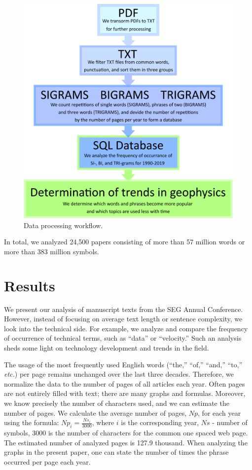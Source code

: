 \documentclass[geosciences,article,submit,moreauthors,pdftex]{Definitions/mdpi}
\begin{document}
\begin{figure}[ht!]
\centering
\includegraphics[scale=1]{scheme.png}
\caption{Data processing workflow.}
\label{scheme_workflow}
\end{figure}


In total, we analyzed 24,500 papers consisting of more than 57 million words or more than 383 million symbols.

 
\section{Results}

We present our analysis of manuscript texts from the SEG Annual Conference. However, instead of focusing on average text length or sentence complexity, we look into the technical side. For example, we analyze and compare the frequency of occurrence of technical terms, such as ``data'' or ``velocity.'' Such an analysis sheds some light on technology development and trends in the field.

The usage of the most frequently used English words (``the,'' ``of,'' ``and,'' ``to,'' \textit{etc.}) per page remains unchanged over the last three decades. Therefore, we normalize the data to the number of pages of all articles each year. Often pages are not entirely filled with text; there are many graphs and formulas. Moreover, we know precisely the number of characters used, and we can estimate the number of pages.
We calculate the average number of pages, $Np$, for each year using the formula: $Np_i = \frac{Ns_i}{3000}$, where $i$ is the corresponding year, $Ns$ - number of symbols, 3000 is the number of characters for the common one spaced web page. The estimated number of analyzed pages is 127.9 thousand.
When analyzing the graphs in the present paper, one can state the number of times the phrase occurred per page each year.
\end{document}
